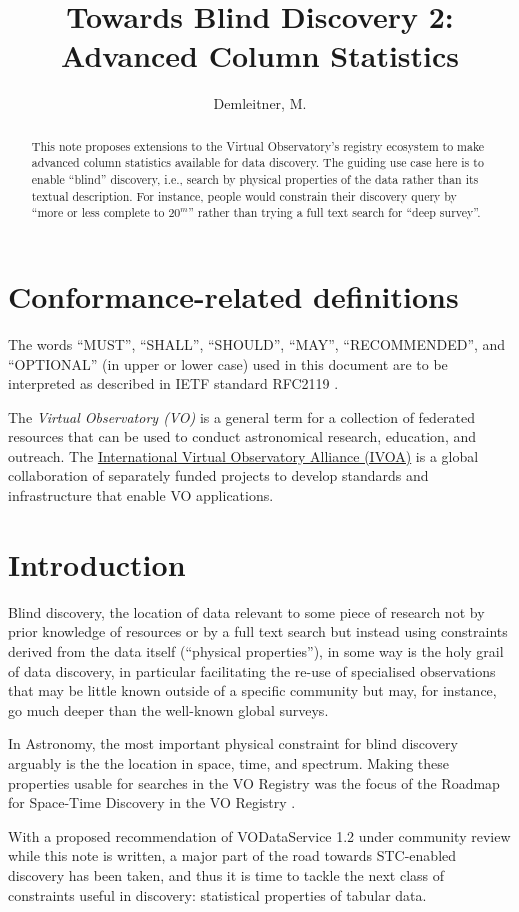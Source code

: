 \documentclass[11pt,a4paper]{ivoa}
\title{Towards Blind Discovery 2: Advanced Column Statistics}
\author[https://wiki.ivoa.net/twiki/bin/view/IVOA/MarkusDemleitner]{Demleitner, M.}
\begin{document}
\begin{abstract}
This note proposes extensions to the Virtual Observatory's registry
ecosystem to make advanced column statistics available for data
discovery.  The guiding use case here is to enable ``blind'' discovery,
i.e., search by physical properties of the data rather
than its textual description. For instance, people would constrain their
discovery query by ``more or less complete to $20^m$'' rather than
trying a full text search for ``deep survey''.
\end{abstract}


\section*{Conformance-related definitions}

The words ``MUST'', ``SHALL'', ``SHOULD'', ``MAY'', ``RECOMMENDED'', and
``OPTIONAL'' (in upper or lower case) used in this document are to be
interpreted as described in IETF standard RFC2119 \citep{std:RFC2119}.

The \emph{Virtual Observatory (VO)} is a
general term for a collection of federated resources that can be used
to conduct astronomical research, education, and outreach.
The \href{http://www.ivoa.net}{International
Virtual Observatory Alliance (IVOA)} is a global
collaboration of separately funded projects to develop standards and
infrastructure that enable VO applications.


\section{Introduction}

Blind discovery, the location of data relevant to some piece of research
not by prior knowledge of resources or by a full text search but 
instead using
constraints derived from the data itself (``physical properties''), in some
way is the holy grail of data discovery, in particular facilitating the
re-use of specialised observations that may be little known outside of a
specific community but may, for instance, go much deeper than the
well-known global surveys.

In Astronomy, the most important physical constraint for blind discovery
arguably is the the location in space, time, and spectrum.  Making these
properties usable for searches in the VO Registry was the focus of the
Roadmap for Space-Time Discovery in the VO Registry \citep{std:stcReg}.

With a proposed recommendation of VODataService 1.2 \citep{pr:VODS12}
under community review while this note is written, a major part of the
road towards STC-enabled discovery has been taken, and thus it is time
to tackle the next class of constraints useful in discovery: statistical
properties of tabular data.
\end{document}
